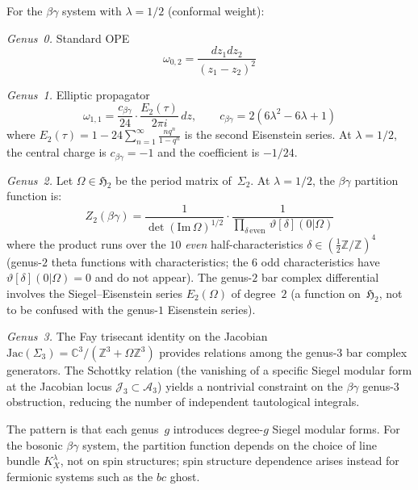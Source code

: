 \begin{example}
For the $\beta\gamma$ system with $\lambda = 1/2$ (conformal weight):

\emph{Genus~0.} Standard OPE
\[\omega_{0,2} = \frac{dz_1 dz_2}{(z_1 - z_2)^2}\]

\emph{Genus~1.} Elliptic propagator
\[\omega_{1,1} = \frac{c_{\beta\gamma}}{24} \cdot \frac{E_2(\tau)}{2\pi i}\, dz, \qquad c_{\beta\gamma} = 2(6\lambda^2 - 6\lambda + 1)\]
where $E_2(\tau) = 1 - 24\sum_{n=1}^\infty \frac{nq^n}{1-q^n}$ is the second Eisenstein series. At $\lambda = 1/2$, the central charge is $c_{\beta\gamma} = -1$ and the coefficient is $-1/24$.

\emph{Genus~2.} Let $\Omega \in \mathfrak{H}_2$ be the period matrix of~$\Sigma_2$. At $\lambda = 1/2$, the $\beta\gamma$ partition function is:
\[Z_2(\beta\gamma) = \frac{1}{\det(\mathrm{Im}\,\Omega)^{1/2}} \cdot \frac{1}{\prod_{\delta\,\text{even}}\, \vartheta[\delta](0|\Omega)}\]
where the product runs over the $10$ \emph{even} half-characteristics $\delta \in (\tfrac{1}{2}\mathbb{Z}/\mathbb{Z})^4$ (genus-$2$ theta functions with characteristics; the $6$ odd characteristics have $\vartheta[\delta](0|\Omega) = 0$ and do not appear). The genus-$2$ bar complex differential involves the Siegel--Eisenstein series $E_2(\Omega)$ of degree~$2$ (a function on~$\mathfrak{H}_2$, not to be confused with the genus-$1$ Eisenstein series).

\emph{Genus~3.} The Fay trisecant identity on the Jacobian $\mathrm{Jac}(\Sigma_3) = \mathbb{C}^3/(\mathbb{Z}^3 + \Omega\mathbb{Z}^3)$ provides relations among the genus-$3$ bar complex generators. The Schottky relation (the vanishing of a specific Siegel modular form at the Jacobian locus $\mathcal{J}_3 \subset \mathcal{A}_3$) yields a nontrivial constraint on the $\beta\gamma$ genus-$3$ obstruction, reducing the number of independent tautological integrals.

The pattern is that each genus~$g$ introduces degree-$g$ Siegel modular forms. For the bosonic $\beta\gamma$ system, the partition function depends on the choice of line bundle $K_X^\lambda$, not on spin structures; spin structure dependence arises instead for fermionic systems such as the $bc$ ghost.
\end{example}

